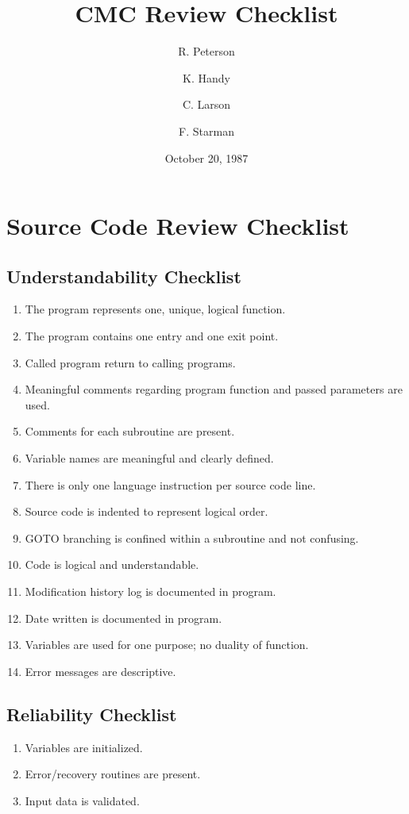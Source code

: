 \makeindex

\title{CMC Review Checklist}
\author{R. Peterson \and K. Handy \and C. Larson \and F. Starman}
\date{October 20, 1987}
\maketitle
\tableofcontents
\chapter{Source Code Review Checklist}
 \section {Understandability Checklist}
 \begin{enumerate}
  \item The program represents one, unique, logical function.
  \item The program contains one entry and one exit point.
  \item Called program return to calling programs.
  \item Meaningful comments regarding program function and passed parameters
    are used.
  \item Comments for each subroutine are present.
  \item Variable names are meaningful and clearly defined.
  \item There is only one language instruction per source code line.
  \item Source code is indented to represent logical order.
  \item GOTO branching is confined within a subroutine and not confusing.
  \item Code is logical and understandable.
  \item Modification history log is documented in program.
  \item Date written is documented in program.
  \item Variables are used for one purpose; no duality of function.
  \item Error messages are descriptive.
 \end{enumerate}
 \section {Reliability Checklist}
 \begin{enumerate}
  \item Variables are initialized.
  \item Error/recovery routines are present.
  \item Input data is validated.
 \end{enumerate}
